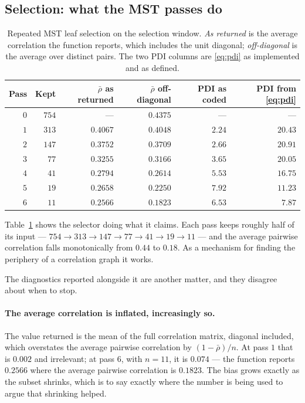 \documentclass[11pt,a4paper]{article}
\begin{document}
\subsection{Selection: what the MST passes do}

\begin{table}[t]
\centering
\caption{Repeated MST leaf selection on the selection window. \emph{As
returned} is the average correlation the function reports, which includes the
unit diagonal; \emph{off-diagonal} is the average over distinct pairs. The two
PDI columns are \eqref{eq:pdi} as implemented and as defined.}
\label{tab:mst}
\begin{tabular}{rrrrrr}
\toprule
Pass & Kept & $\bar\rho$ as returned & $\bar\rho$ off-diagonal & PDI as coded & PDI from \eqref{eq:pdi} \\
\midrule
$0$ & $754$ & ---      & $0.4375$ & ---     & ---      \\
$1$ & $313$ & $0.4067$ & $0.4048$ & $2.24$  & $20.43$  \\
$2$ & $147$ & $0.3752$ & $0.3709$ & $2.66$  & $20.91$  \\
$3$ & $77$  & $0.3255$ & $0.3166$ & $3.65$  & $20.05$  \\
$4$ & $41$  & $0.2794$ & $0.2614$ & $5.53$  & $16.75$  \\
$5$ & $19$  & $0.2658$ & $0.2250$ & $7.92$  & $11.23$  \\
$6$ & $11$  & $0.2566$ & $0.1823$ & $6.53$  & $7.87$   \\
\bottomrule
\end{tabular}
\end{table}

Table~\ref{tab:mst} shows the selector doing what it claims. Each pass keeps
roughly half of its input --- $754 \to 313 \to 147 \to 77 \to 41 \to 19 \to 11$
--- and the average pairwise correlation falls monotonically from $0.44$ to
$0.18$. As a mechanism for finding the periphery of a correlation graph it
works.

The diagnostics reported alongside it are another matter, and they disagree
about when to stop.

\paragraph{The average correlation is inflated, increasingly so.}
The value returned is the mean of the full correlation matrix, diagonal
included, which overstates the average pairwise correlation by
$(1 - \bar\rho)/n$. At pass $1$ that is $0.002$ and irrelevant; at pass $6$,
with $n = 11$, it is $0.074$ --- the function reports $0.2566$ where the
average pairwise correlation is $0.1823$. The bias grows exactly as the subset
shrinks, which is to say exactly where the number is being used to argue that
shrinking helped.
\end{document}
